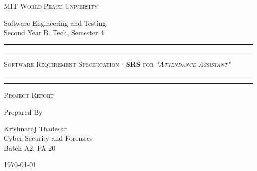 \documentclass[11pt]{article}
\begin{document}
\begin{titlepage}
	\centering


	\huge\textsc{
		MIT World Peace University
	}\\

	\vspace{0.75\baselineskip} %

	\LARGE{
		Software Engineering and Testing\\
		Second Year B. Tech, Semester 4
	}

	\vfill %


	\rule{\textwidth}{1.6pt}\vspace*{-\baselineskip}\vspace*{2pt}
	\rule{\textwidth}{0.6pt}
	\vspace{0.75\baselineskip} %



	\huge{\textsc{
			Software Requirement Specification - \textbf{SRS} for
			\textit{"Attendance Assistant"}
		}} \\



	\vspace{0.5\baselineskip} %
	\rule{\textwidth}{0.6pt}\vspace*{-\baselineskip}\vspace*{2.8pt}
	\rule{\textwidth}{1.6pt}

	\vspace{1\baselineskip} %


	\LARGE\textsc{
		Project Report
	} %
	\vfill


	Prepared By
	\vspace{0.5\baselineskip} %

	\Large{
		Krishnaraj Thadesar \\
		Cyber Security and Forensics\\
		Batch A2, PA 20
	}


	\vspace{0.5\baselineskip} %
	\today

\end{titlepage}
\end{document}
